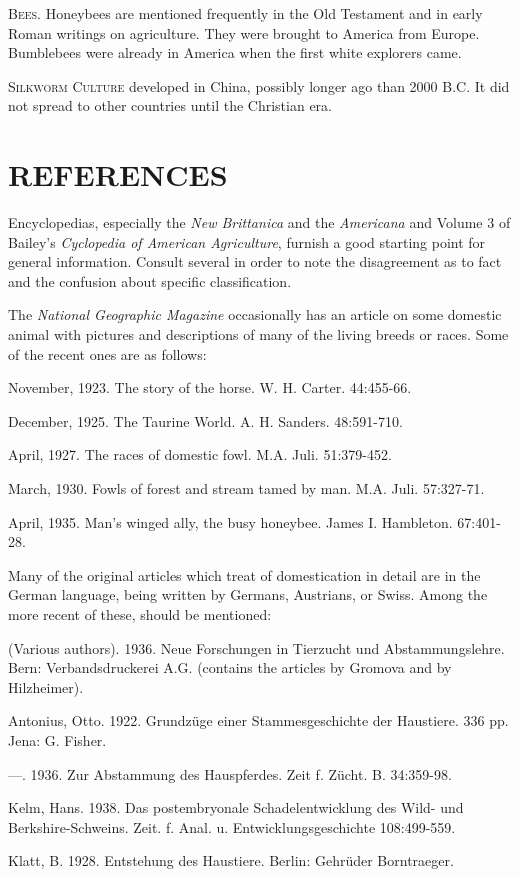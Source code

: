 \textsc{Bees}. Honeybees are mentioned frequently in the Old Testament and in early Roman writings on agriculture.
They were brought to America from Europe. Bumblebees were already in America when the first white explorers came.

\textsc{Silkworm Culture} developed in China, possibly longer ago than 2000 B.C. It did not spread to other countries
until the Christian era. 

\section*{REFERENCES}
Encyclopedias, especially the \textit{New Brittanica} and the \textit{Americana} and Volume 3 of Bailey's
\textit{Cyclopedia of American Agriculture}, furnish a good starting point for general information. Consult several
in order to note the disagreement as to fact and the confusion about specific classification.

The \textit{National Geographic Magazine} occasionally has an article on some domestic animal with pictures and 
descriptions of many of the living breeds or races. Some of the recent ones are as follows: 
\\
\begin{hangparas}{0.25in}{1}%
November, 1923. The story of the horse. W. H. Carter. 44:455-66.

December, 1925. The Taurine World. A. H. Sanders. 48:591-710.

April, 1927. The races of domestic fowl. M.A. Juli. 51:379-452.

March, 1930. Fowls of forest and stream tamed by man. M.A. Juli. 57:327-71.

April, 1935. Man's winged ally, the busy honeybee. James I. Hambleton. 67:401-28.
\end{hangparas}

Many of the original articles which treat of domestication in detail are in the German language, being written by 
Germans, Austrians, or Swiss. Among the more recent of these, should be mentioned:

\begin{hangparas}{0.5in}{1}%
(Various authors). 1936. Neue Forschungen in Tierzucht und Abstammungslehre. Bern: Verbandsdruckerei 
A.G. (contains the articles by Gromova and by Hilzheimer).

Antonius, Otto. 1922. Grundz\"{u}ge einer Stammesgeschichte der Haustiere. 336 pp. Jena: G. Fisher.

---. 1936. Zur Abstammung des Hauspferdes. Zeit f. Z\"{u}cht. B. 34:359-98.

Kelm, Hans. 1938. Das postembryonale Schadelentwicklung des Wild- und Berkshire-Schweins. Zeit. f. Anal. u. Entwicklungsgeschichte 108:499-559.

Klatt, B. 1928. Entstehung des Haustiere. Berlin: Gehr\"{u}der Borntraeger. 
\end{hangparas}

